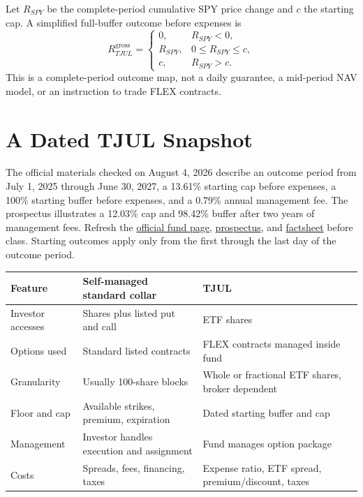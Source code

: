 \documentclass[11pt]{article}
\begin{document}
Let $R_{SPY}$ be the complete-period cumulative SPY price change and $c$ the
starting cap. A simplified full-buffer outcome before expenses is
\begin{equation}
  \label{eq:defined-outcome}
  R_{TJUL}^{\mathrm{gross}}=
  \begin{cases}
    0, & R_{SPY}<0,\\
    R_{SPY}, & 0\leq R_{SPY}\leq c,\\
    c, & R_{SPY}>c.
  \end{cases}
\end{equation}
This is a complete-period outcome map, not a daily guarantee, a mid-period NAV
model, or an instruction to trade FLEX contracts.

\section{A Dated TJUL Snapshot}

The official materials checked on August 4, 2026 describe an outcome period
from July 1, 2025 through June 30, 2027, a 13.61\% starting cap before expenses,
a 100\% starting buffer before expenses, and a 0.79\% annual management fee.
The prospectus illustrates a 12.03\% cap and 98.42\% buffer after two years of
management fees. Refresh the
\href{https://www.innovatoretfs.com/etf/?ticker=TJUL}{official fund page},
\href{https://www.innovatoretfs.com/pdf/tjul_prospectus.pdf}{prospectus}, and
\href{https://www.innovatoretfs.com/pdf/tjul_factsheet.pdf}{factsheet} before
class. Starting outcomes apply only from the first through the last day of the
outcome period.

\begin{center}
\small
\renewcommand{\arraystretch}{1.18}
\begin{tabular}{p{}p{}p{}}
\hline
\textbf{Feature} & \textbf{Self-managed standard collar} & \textbf{TJUL}\\
\hline
Investor accesses & Shares plus listed put and call & ETF shares\\
Options used & Standard listed contracts & FLEX contracts managed inside fund\\
Granularity & Usually 100-share blocks & Whole or fractional ETF shares, broker dependent\\
Floor and cap & Available strikes, premium, expiration & Dated starting buffer and cap\\
Management & Investor handles execution and assignment & Fund manages option package\\
Costs & Spreads, fees, financing, taxes & Expense ratio, ETF spread, premium/discount, taxes\\
\hline
\end{tabular}
\end{center}
\end{document}

